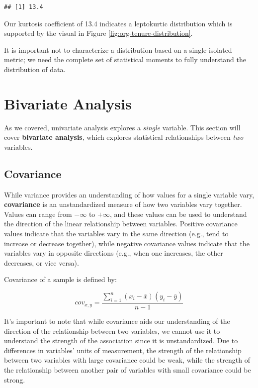 \documentclass[
]{book}
\begin{document}
\begin{verbatim}
## [1] 13.4
\end{verbatim}

Our kurtosis coefficient of 13.4 indicates a leptokurtic distribution which is supported by the visual in Figure \ref{fig:org-tenure-distribution}.

It is important not to characterize a distribution based on a single isolated metric; we need the complete set of statistical moments to fully understand the distribution of data.

\hypertarget{bivariate-analysis}{%
\section{Bivariate Analysis}\label{bivariate-analysis}}

As we covered, univariate analysis explores a \emph{single} variable. This section will cover \textbf{bivariate analysis}, which explores statistical relationships between \emph{two} variables.

\hypertarget{covariance}{%
\subsection{Covariance}\label{covariance}}

While variance provides an understanding of how values for a single variable vary, \textbf{covariance} is an unstandardized measure of how two variables vary together. Values can range from \(-\infty\) to \(+\infty\), and these values can be used to understand the direction of the linear relationship between variables. Positive covariance values indicate that the variables vary in the same direction (e.g., tend to increase or decrease together), while negative covariance values indicate that the variables vary in opposite directions (e.g., when one increases, the other decreases, or vice versa).

Covariance of a sample is defined by:

\[ cov_{x,y} = \frac{\displaystyle\sum_{i=1}^{n} (x_{i}-\bar{x})(y_{i}-\bar{y})}{n-1} \]

It's important to note that while covariance aids our understanding of the direction of the relationship between two variables, we cannot use it to understand the strength of the association since it is unstandardized. Due to differences in variables' units of measurement, the strength of the relationship between two variables with large covariance could be weak, while the strength of the relationship between another pair of variables with small covariance could be strong.
\end{document}
